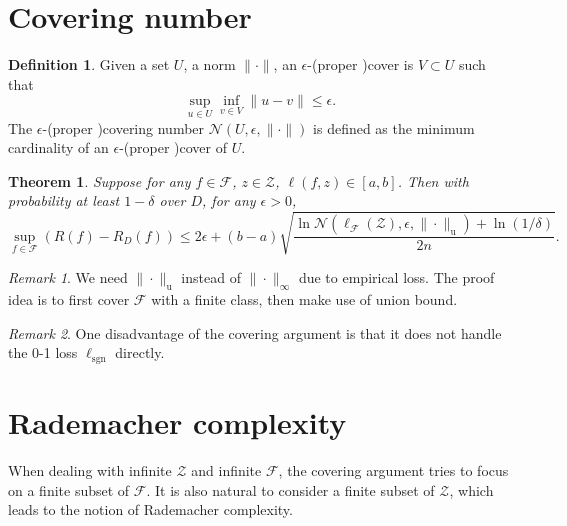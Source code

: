 \documentclass[openany]{book}
\newtheorem{theorem}{Theorem}[chapter]
\theoremstyle{definition}
\newtheorem{definition}{Definition}[chapter]
\theoremstyle{remark}
\newtheorem*{remark}{Remark}
\begin{document}
\section{Covering number}
\begin{definition}
    Given a set $U$, a norm $\|\cdot\|$, an $\epsilon$-(proper )cover is $V\subset U$ such that
    \begin{equation*}
        \sup_{u\in U}\inf_{v\in V}\|u-v\|\le\epsilon.
    \end{equation*}
    The $\epsilon$-(proper )covering number $\mathcal{N}(U,\epsilon,\|\cdot\|)$ is defined as the minimum cardinality of an $\epsilon$-(proper )cover of $U$.
\end{definition}
\begin{theorem}
    Suppose for any $f\in \mathcal{F}$, $z\in \mathcal{Z}$, $\ell(f,z)\in[a,b]$. Then with probability at least $1-\delta$ over $D$, for any $\epsilon>0$,
    \begin{equation*}
        \sup_{f\in \mathcal{F}}\left(R(f)-R_{D}(f)\right)\le2\epsilon+(b-a)\sqrt{\frac{\ln \mathcal{N}\left(\ell_{\mathcal{F}}(\mathcal{Z}),\epsilon,\|\cdot\|_{\mathrm{u}}\right)+\ln(1/\delta)}{2n}}.
    \end{equation*}
\end{theorem}
\begin{remark}
    We need $\|\cdot\|_{\mathrm{u}}$ instead of $\|\cdot\|_{\infty}$ due to empirical loss. The proof idea is to first cover $\mathcal{F}$ with a finite class, then make use of union bound.
\end{remark}
\begin{remark}
    One disadvantage of the covering argument is that it does not handle the 0-1 loss $\ell_{\mathrm{sgn}}$ directly.
\end{remark}

\section{Rademacher complexity}
When dealing with infinite $\mathcal{Z}$ and infinite $\mathcal{F}$, the covering argument tries to focus on a finite subset of $\mathcal{F}$. It is also natural to consider a finite subset of $\mathcal{Z}$, which leads to the notion of Rademacher complexity.
\end{document}
